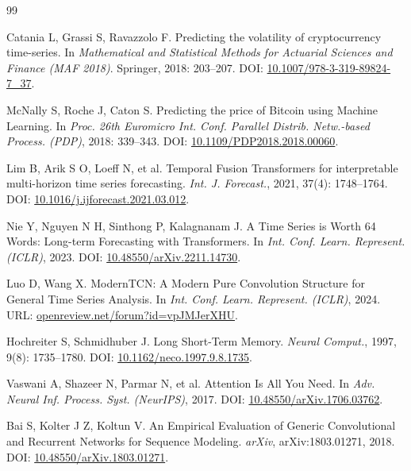 \documentclass[12pt,a4paper]{ctexart}
\begin{document}
\begin{thebibliography}{99}

Catania L, Grassi S, Ravazzolo F.
Predicting the volatility of cryptocurrency time-series.
In \textit{Mathematical and Statistical Methods for Actuarial Sciences and Finance (MAF 2018)}. Springer, 2018: 203--207.
DOI: \href{https://doi.org/10.1007/978-3-319-89824-7\_37}{10.1007/978-3-319-89824-7\_37}.

McNally S, Roche J, Caton S.
Predicting the price of Bitcoin using Machine Learning.
In \textit{Proc. 26th Euromicro Int. Conf. Parallel Distrib. Netw.-based Process. (PDP)}, 2018: 339--343.
DOI: \href{https://doi.org/10.1109/PDP2018.2018.00060}{10.1109/PDP2018.2018.00060}.

Lim B, Arik S O, Loeff N, et al.
Temporal Fusion Transformers for interpretable multi-horizon time series forecasting.
\textit{Int. J. Forecast.}, 2021, 37(4): 1748--1764.
DOI: \href{https://doi.org/10.1016/j.ijforecast.2021.03.012}{10.1016/j.ijforecast.2021.03.012}.

Nie Y, Nguyen N H, Sinthong P, Kalagnanam J.
A Time Series is Worth 64 Words: Long-term Forecasting with Transformers.
In \textit{Int. Conf. Learn. Represent. (ICLR)}, 2023.
DOI: \href{https://doi.org/10.48550/arXiv.2211.14730}{10.48550/arXiv.2211.14730}.

Luo D, Wang X.
ModernTCN: A Modern Pure Convolution Structure for General Time Series Analysis.
In \textit{Int. Conf. Learn. Represent. (ICLR)}, 2024.
URL: \href{https://openreview.net/forum?id=vpJMJerXHU}{openreview.net/forum?id=vpJMJerXHU}.

Hochreiter S, Schmidhuber J.
Long Short-Term Memory.
\textit{Neural Comput.}, 1997, 9(8): 1735--1780.
DOI: \href{https://doi.org/10.1162/neco.1997.9.8.1735}{10.1162/neco.1997.9.8.1735}.

Vaswani A, Shazeer N, Parmar N, et al.
Attention Is All You Need.
In \textit{Adv. Neural Inf. Process. Syst. (NeurIPS)}, 2017.
DOI: \href{https://doi.org/10.48550/arXiv.1706.03762}{10.48550/arXiv.1706.03762}.

Bai S, Kolter J Z, Koltun V.
An Empirical Evaluation of Generic Convolutional and Recurrent Networks for Sequence Modeling.
\textit{arXiv}, arXiv:1803.01271, 2018.
DOI: \href{https://doi.org/10.48550/arXiv.1803.01271}{10.48550/arXiv.1803.01271}.


\end{thebibliography}
\end{document}
